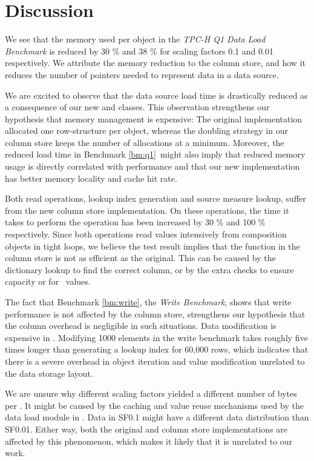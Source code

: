 \section{Discussion}
\label{sec:Discussion}
We see that the memory used per object in the \textit{TPC-H Q1 Data Load Benchmark} is reduced by 30 \% and 38 \% for scaling factors 0.1 and 0.01 respectively. We attribute the memory reduction to the column store, and how it reduces the number of pointers needed to represent data in a data source.

We are excited to observe that the data source load time is drastically reduced as a consequence of our new  and  classes. This observation strengthens our hypothesis that memory management is expensive: The original implementation allocated one row-structure per object, whereas the doubling strategy in our column store keeps the number of allocations at a minimum. Moreover, the reduced load time in Benchmark \ref{bm:q1}~might also imply that reduced memory usage is directly correlated with performance and that our new implementation has better memory locality and cache hit rate.

Both read operations, lookup index generation and source measure lookup, suffer from the new column store implementation. On these operations, the time it takes to perform the operation has been increased by 30 \% and 100 \% respectively. Since both operations read values intensively from composition objects in tight loops, we believe the test result implies that the  function in the column store is not as efficient as the original. This can be caused by the dictionary lookup to find the correct column, or by the extra checks to ensure capacity or for \nil~values.

The fact that Benchmark \ref{bm:write}, the \textit{Write Benchmark}, shows that write performance is not affected by the column store, strengthens our hypothesis that the column overhead is negligible in such situations. Data modification is expensive in \gap. Modifying 1000 elements in the write benchmark takes roughly five times longer than generating a lookup index for 60,000 rows, which indicates that there is a severe overhead in object iteration and value modification unrelated to the data storage layout.

We are unsure why different scaling factors yielded a different number of bytes per \lineitem. It might be caused by the caching and value reuse mechanisms used by the data load module in \gap. Data in SF0.1 might have a different data distribution than SF0.01. Either way, both the original and column store implementations are affected by this phenomenon, which makes it likely that it is unrelated to our work.

